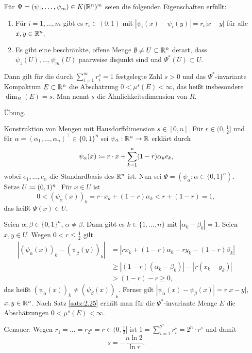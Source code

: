 \documentclass[a4paper,twoside,DIV15,BCOR12mm]{scrbook}
\begin{document}
\begin{satz}[Hutchinson, 1981]
\label{satz:2.25}
Für $\Psi= (\psi_1,\ldots,\psi_m)\in K(\mathbb{R}^n)^m$ seien die folgenden Eigenschaften erfüllt:
\begin{enumerate}
\item Für $i=1,\ldots,m$ gibt es $r_i\in(0,1)$ mit $|\psi_i(x) - \psi_i(y)| = r_i|x-y|$ für alle $x,y\in\mathbb{R}^n$.
\item Es gibt eine beschränkte, offene Menge $\emptyset \ne U\subset\mathbb{R}^n$ derart, dass $\psi_1(U),\ldots,\psi_m(U)$ paarweise disjunkt sind und $\Psi^*(U) \subset U$.
\end{enumerate}
Dann gilt für die durch $\sum_{i=1}^m r_i^s = 1$ festgelegte Zahl $s>0$ und das $\Psi^*$-invariante Kompaktum $E\subset \mathbb{R}^n$ die Abschätzung $0<\mu^s(E) < \infty$, das heißt insbesondere $\dim_H(E)= s$. Man nennt $s$ die Ähnlichkeitsdimension von $R$.
\end{satz}

\begin{beweis}
Übung.
\end{beweis}

Konstruktion von Mengen mit Hausdorffdimension $s\in[0,n]$. Für $r\in(0,\frac12]$ und für $\alpha=(\alpha_1,\ldots,\alpha_n)^\top\in\{0,1\}^n$ sei $\psi_\alpha : \mathbb{R}^n \to \mathbb{R}$ 
erklärt durch 
$$
\psi_\alpha(x) \da r\cdot x + \sum_{k=1}^n (1-r)\alpha_ke_k,
$$ 
wobei $e_1,\ldots,e_n$ die Standardbasis des $\mathbb{R}^n$ ist. Nun sei $\Psi=(\psi_\alpha: \alpha\in\{0,1\}^n)$. Setze $U\da (0,1)^n$. Für $x\in U$ ist 
$$
0 < (\psi_\alpha(x))_k = r\cdot x_k + (1-r)\alpha_k < r + (1-r) = 1,
$$ das heißt $\Psi(x) \in U$.

Seien $\alpha,\beta \in\{0,1\}^n$, $\alpha \ne \beta$. Dann gibt es $k\in\{1,\ldots,n\}$ mit $|\alpha_k - \beta_k| = 1$. Seien $x,y\in U$. Wegen $0<r\le \frac12$ gilt
\begin{align*}
|(\psi_\alpha(x))_k - (\psi_\beta(y))_k|
&= |rx_k + (1-r)\alpha_k - ry_k - (1-r)\beta_k|\\
&\ge |(1-r)(\alpha_k - \beta_k)| - |r(x_k-y_k)|\\
&> (1-r) - r \ge 0,
\end{align*}
das heißt $(\psi_\alpha(x))_k \ne (\psi_\beta(x))_k$. Ferner gilt $|\psi_\alpha(x) - \psi_\beta(x)| = r |x-y|$, $x,y\in \mathbb{R}^n$.  Nach Satz \ref{satz:2.25} erhält man für die $\Psi^*$-invariante Menge $E$ die Abschätzungen $0<\mu^s(E)<\infty$. 

Genauer: Wegen $r_1=\ldots=r_{2^n}=r\in(0,\frac12]$ ist $1 = \sum_{i=1}^{2^n} r_i^s = 2^n \cdot r^s $ und damit
\[
s = -\frac{n \ln 2}{\ln r}.
\]
\end{document}
